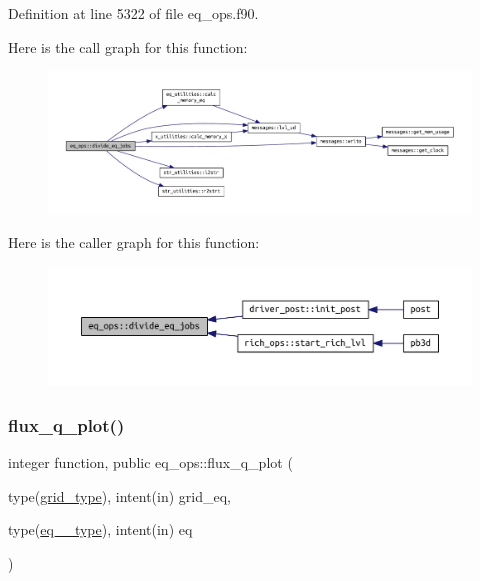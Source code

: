 Definition at line 5322 of file eq\+\_\+ops.\+f90.

Here is the call graph for this function\+:\nopagebreak
\begin{figure}[H]
\begin{center}
\leavevmode
\includegraphics[width=350pt]{namespaceeq__ops_a8fae749abe55865d8135fef536a8e8f1_cgraph}
\end{center}
\end{figure}
Here is the caller graph for this function\+:\nopagebreak
\begin{figure}[H]
\begin{center}
\leavevmode
\includegraphics[width=350pt]{namespaceeq__ops_a8fae749abe55865d8135fef536a8e8f1_icgraph}
\end{center}
\end{figure}
\mbox{\label{namespaceeq__ops_af0effe20188d46a44680c2648e4572e9}} 
\subsubsection{\texorpdfstring{flux\+\_\+q\+\_\+plot()}{flux\_q\_plot()}}
{\footnotesize\ttfamily integer function, public eq\+\_\+ops\+::flux\+\_\+q\+\_\+plot (\begin{DoxyParamCaption}\item[{type(\hyperlink{structgrid__vars_1_1grid__type}{grid\+\_\+type}), intent(in)}]{grid\+\_\+eq,  }\item[{type(\hyperlink{structeq__vars_1_1eq__1__type}{eq\+\_\+1\+\_\+type}), intent(in)}]{eq }\end{DoxyParamCaption})}



